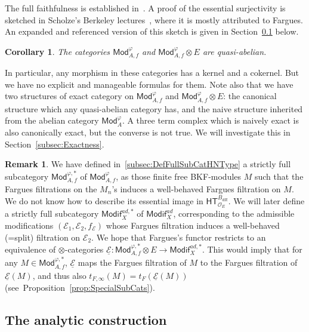 \documentclass[11pt]{article}
\newtheorem{coro}[theo]{Corollary}
\theoremstyle{definition}
\newtheorem{rema}[theo]{Remark}
\numberwithin{equation}{section}
\numberwithin{figure}{section}
\numberwithin{table}{section}
\newcommand{\Mod}{\mathsf{Mod}}
\newcommand{\Modif}{\mathsf{Modif}}
\newcommand{\HT}{\mathsf{HT}}
\newcommand*{\dR}{dR}
\begin{document}
The full faithfulness is established in~\cite[4.29]{BaMoSc16}. A proof of the essential surjectivity is sketched in Scholze's Berkeley lectures~\cite{ScWe15}, where it is mostly attributed to Fargues. An expanded and referenced version of this sketch is given in Section~\ref{subsec:AnalConstruction} below.

\begin{coro}
The categories $\Mod_{A,f}^{\varphi}$ and $\Mod_{A,f}^{\varphi}\otimes E$ are quasi-abelian.
\end{coro}

In particular, any morphism in these categories has a kernel and a cokernel. But we have no explicit and manageable formulas for them. Note also that we have two structures of exact category on $\Mod_{A,f}^{\varphi}$ and $\Mod_{A,f}^{\varphi}\otimes E$: the canonical structure which any quasi-abelian category has, and the naive structure inherited from the abelian category $\Mod_{A}^{\varphi}$. A three term complex which is naively exact is also canonically exact, but the converse is not true. We will investigate this in Section~\ref{subsec:Exactness}.
\begin{rema}
We have defined in~\ref{subsec:DefFullSubCatHNType} a strictly full subcategory $\Mod_{A,f}^{\varphi,\ast}$ of $\Mod_{A,f}^{\varphi}$, as those finite free BKF-modules $M$ such that the Fargues filtrations on the $M_{n}$'s induces a well-behaved Fargues filtration on $M$. We do not know how to describe its essential image in $\HT_{\mathcal{O}_{E}}^{B_{\dR}}$. We will later define a strictly full subcategory $\Modif_{X}^{ad,\ast}$ of $\Modif_{X}^{ad}$, corresponding to the admissible modifications $(\mathcal{E}_{1},\mathcal{E}_{2},f_{\mathcal{E}})$ whose Fargues filtration induces a well-behaved (=split) filtration on $\mathcal{E}_{2}$. We hope that Fargues's functor restricts to an equivalence of $\otimes$-categories $\underline{\mathcal{E}}:\Mod_{A,f}^{\varphi,\ast}\otimes E\rightarrow\Modif_{X}^{ad,\ast}$. This would imply that for any $M\in\Mod_{A,f}^{\varphi,\ast}$, $\underline{\mathcal{E}}$ maps the Fargues filtration of $M$ to the Fargues filtration of $\underline{\mathcal{E}}(M)$, and thus also $t_{F,\infty}(M)=t_{F}(\underline{\mathcal{E}}(M))$ (see~Proposition~\ref{prop:SpecialSubCats}).
\end{rema}

\subsection{The analytic construction}\label{subsec:AnalConstruction}
\end{document}

